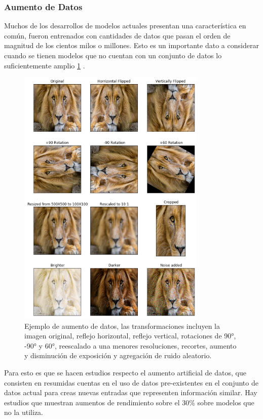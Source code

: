 \documentclass[letter,12pt]{report}
\begin{document}
\subsubsection{Aumento de Datos}
Muchos de los desarrollos de modelos actuales presentan una característica en común,
fueron entrenados con cantidades de datos que pasan el orden de magnitud de los cientos
milos o millones. Esto es un importante dato a considerar cuando se tienen modelos que
no cuentan con un conjunto de datos lo suficientemente amplio \ref{fig:dataaugmen}
\cite{Dataaug}.

\begin{figure}[H]
    \centering
    \includegraphics[width=0.8\textwidth]{dataaugmen}
    \caption{Ejemplo de aumento de datos, las transformaciones incluyen la imagen
    original, reflejo horizontal, reflejo vertical, rotaciones de 90°, -90° y 60°,
reescalado a una menores resoluciones, recortes, aumento y disminución de exposición y
agregación de ruido aleatorio.}
    \label{fig:dataaugmen}
\end{figure}

Para esto es que se hacen estudios respecto el aumento artificial de datos, que consisten
en resumidas cuentas en el uso de datos pre-existentes en el conjunto de datos actual
para creas nuevas entradas que representen información similar. Hay estudios que muestran
aumentos de rendimiento sobre el 30\% \cite{Augment} sobre modelos que no la utiliza.
\end{document}
